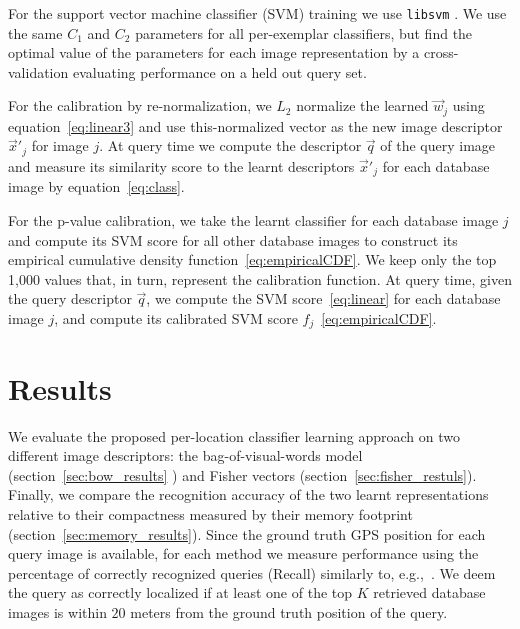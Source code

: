       For the support vector machine classifier (SVM) training we use {\tt libsvm} \cite{libsvm}. We use the same $C_1$ and $C_2$ parameters for all per-exemplar classifiers, but find the optimal value of the parameters for each image representation by a cross-validation evaluating performance on a held out query set.

      For the calibration by re-normalization, we $L_2$ normalize the learned $\vec{w}_j$ using equation~\eqref{eq:linear3} and use this-normalized vector as the new image descriptor $\vec{x}'_j$ for image $j$. At query time we compute the descriptor $\vec{q}$ of the query image and measure its similarity score to the learnt descriptors $\vec{x}'_j$ for each database image by equation~\eqref{eq:class}.

      For the p-value calibration, we take the learnt classifier for each database image $j$ and compute its SVM score for all other database images to construct its empirical cumulative density function~\eqref{eq:empiricalCDF}. We keep only the top 1,000 values that, in turn, represent the calibration function. At query time, given the query descriptor $\vec{q}$, we compute the SVM score~\eqref{eq:linear} for each database image $j$, and compute its calibrated SVM score $f_j$~\eqref{eq:empiricalCDF}.


\section{Results}
\label{sec:results}
  We evaluate the proposed per-location classifier learning approach on two different image descriptors: the bag-of-visual-words model (section~\ref{sec:bow_results} ) and Fisher vectors (section~\ref{sec:fisher_restuls}).  Finally, we compare the recognition accuracy of the two learnt representations relative to their compactness measured by their memory footprint (section~\ref{sec:memory_results}).
  Since the ground truth GPS position for each query image is available, for each method we measure performance using the percentage of correctly recognized queries (Recall) similarly to, e.g.,~\cite{Chen11,Knopp2010,Sattler-BMVC12}. We deem the query as correctly localized if at least one of the top $K$ retrieved database images is within $20$ meters from the ground truth position of the query. 



